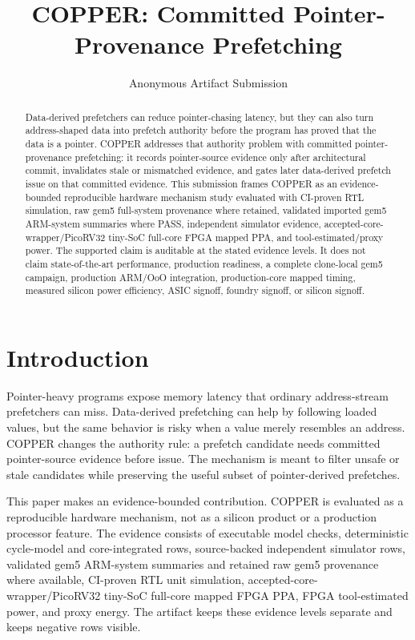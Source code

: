 \documentclass[10pt]{article}
\title{COPPER: Committed Pointer-Provenance Prefetching}
\author{Anonymous Artifact Submission}
\date{}
\begin{document}
\maketitle

\begin{abstract}
Data-derived prefetchers can reduce pointer-chasing latency, but they can also turn address-shaped data into prefetch authority before the program has proved that the data is a pointer. COPPER addresses that authority problem with committed pointer-provenance prefetching: it records pointer-source evidence only after architectural commit, invalidates stale or mismatched evidence, and gates later data-derived prefetch issue on that committed evidence. This submission frames COPPER as an evidence-bounded reproducible hardware mechanism study evaluated with CI-proven RTL simulation, raw gem5 full-system provenance where retained, validated imported gem5 ARM-system summaries where PASS, independent simulator evidence, accepted-core-wrapper/PicoRV32 tiny-SoC full-core FPGA mapped PPA, and tool-estimated/proxy power. The supported claim is auditable at the stated evidence levels. It does not claim state-of-the-art performance, production readiness, a complete clone-local gem5 campaign, production ARM/OoO integration, production-core mapped timing, measured silicon power efficiency, ASIC signoff, foundry signoff, or silicon signoff.
\end{abstract}

\section{Introduction}
Pointer-heavy programs expose memory latency that ordinary address-stream prefetchers can miss. Data-derived prefetching can help by following loaded values, but the same behavior is risky when a value merely resembles an address. COPPER changes the authority rule: a prefetch candidate needs committed pointer-source evidence before issue. The mechanism is meant to filter unsafe or stale candidates while preserving the useful subset of pointer-derived prefetches.

This paper makes an evidence-bounded contribution. COPPER is evaluated as a reproducible hardware mechanism, not as a silicon product or a production processor feature. The evidence consists of executable model checks, deterministic cycle-model and core-integrated rows, source-backed independent simulator rows, validated gem5 ARM-system summaries and retained raw gem5 provenance where available, CI-proven RTL unit simulation, accepted-core-wrapper/PicoRV32 tiny-SoC full-core mapped FPGA PPA, FPGA tool-estimated power, and proxy energy. The artifact keeps these evidence levels separate and keeps negative rows visible.
\end{document}
